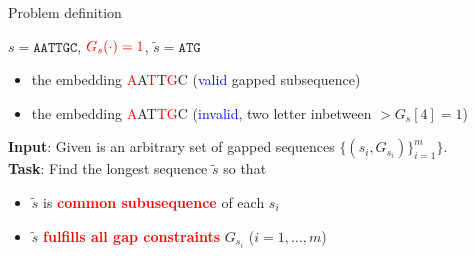 \documentclass{beamer}
\begin{document}
\begin{frame}{Problem definition}

   \begin{example}
      $s=\texttt{AATTGC}$, $\textcolor{red}{G_s(\cdot)=1}$, $\tilde{s}=\texttt{ATG}$
      \begin{itemize}
         \item the embedding \textcolor{red}{A}A\textcolor{red}{T}T\textcolor{red}{G}C (\textcolor{blue}{valid} gapped subsequence)
         \item  the embedding \textcolor{red}{A}A{T}\textcolor{red}{T}\textcolor{red}{G}C (\textcolor{blue}{invalid}, two letter inbetween $> G_s[4]=1$)
      \end{itemize}
   \end{example} \vspace{0.5cm}
    
   \begin{definition}
        \textbf{Input}: Given is an arbitrary set of  gapped sequences $\{ (s_i, G_{s_i})\}_{i=1}^m \}$. \\
        \textbf{Task}: Find the longest  sequence $\tilde{s}$ so that 
        \begin{itemize}
            \item  $\tilde{s}$ is \textcolor{red}{\textbf{common subusequence}} of each $s_i$
            \item $\tilde{s}$ \textcolor{red}{\textbf{fulfills all gap constraints}} $G_{s_i}$ ($i=1, \ldots, m$)
        \end{itemize}
    \end{definition}
\end{frame}
\end{document}
